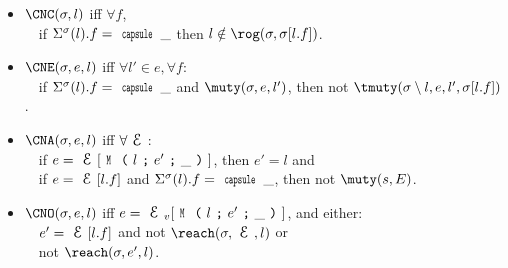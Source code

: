 \newcommand{\qindent}{\\\indent$\quad$}
\begin{itemize}
\item $\CNC(\s, l)$ iff $\forall f$,
\qindent if  $\S(l).f = \Kw{capsule}\,\_$ then $l \notin \rog(\s, \s[l.f])$.
\item $\CNE(\s, e, l)$ iff $\forall l' \in e,\forall f$:
\qindent  if $\S(l).f = \Kw{capsule}\,\_$ and $\muty(\s, e, l')$, then not $\tmuty(\s\setminus l, e, l', \s[l.f])$.
\item $\CNA(\s, e, l)$ iff $\forall \E$:
\qindent if $e = \E[\M{l}{e'}{\_}]$, then $e' = l$ and
\qindent if $e = \E[l.f]$ and $\S(l).f = \Kw{capsule}\,\_$, then not $\muty(s, E)$.

\item $\CNO(\s, e, l)$ iff $e = \EV[\M{l}{e'}{\_}]$, and either:
\qindent $e' = \E[l.f]$ and not $\reach(\s, \E, l)$ or 
\qindent not $\reach(\s, e', l)$.

\end{itemize}

